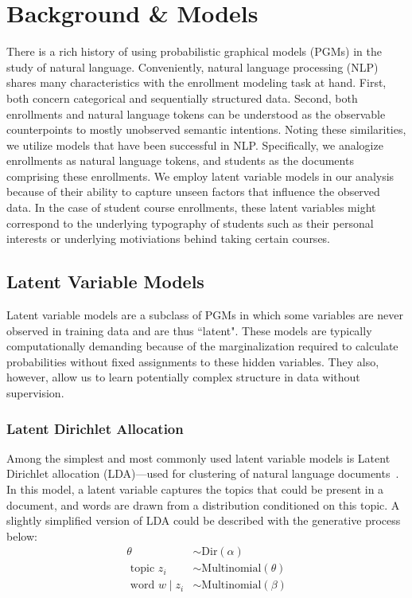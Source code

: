 \documentclass{edm_template}
\begin{document}
\section{Background \& Models}
\label{section:background}

There is a rich history of using probabilistic graphical models (PGMs) in the study of natural language. Conveniently, natural language processing (NLP) shares many characteristics with the enrollment modeling task at hand. First, both concern categorical and sequentially structured data. Second, both enrollments and natural language tokens can be understood as the observable counterpoints to mostly unobserved semantic intentions. Noting these similarities, we utilize models that have been successful in NLP. Specifically, we analogize enrollments as natural language tokens, and students as the documents comprising these enrollments. We employ latent variable models in our analysis because of their ability to capture unseen factors that influence the observed data. In the case of student course enrollments, these latent variables might correspond to the underlying typography of students such as their personal interests or underlying motiviations behind taking certain courses.

\subsection{Latent Variable Models}
\label{section:latent-variable-models}

Latent variable models are a subclass of PGMs in which some variables are never observed in training data and are thus ``latent". These models are typically computationally demanding because of the marginalization required to calculate probabilities without fixed assignments to these hidden variables. They also, however, allow us to learn potentially complex structure in data without supervision. 

\subsubsection{Latent Dirichlet Allocation}
Among the simplest and most commonly used latent variable models is Latent Dirichlet allocation (LDA)---used for clustering of natural language documents~\cite{blei2003latent}. In this model, a latent variable captures the topics that could be present in a document, and words are drawn from a distribution conditioned on this topic. A slightly simplified version of LDA could be described with the generative process below:
\begin{align*}
\theta &\sim \text{Dir}(\alpha) \\
\text{ topic } z_i &\sim \text{Multinomial}(\theta) \\
\text{ word } w \mid z_i &\sim \text{Multinomial}(\beta) \\ 	
\end{align*}
\vspace{-11mm}
\end{document}
